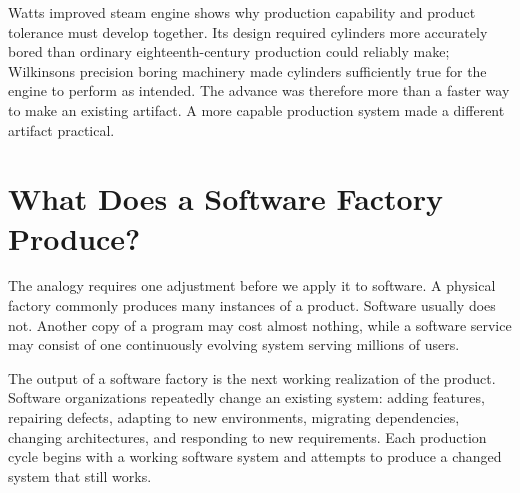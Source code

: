 
Watt\textquotesingle s improved steam engine shows why production capability and product tolerance must develop together. Its design required cylinders more accurately bored than ordinary eighteenth-century production could reliably make; Wilkinson\textquotesingle s precision boring machinery made cylinders sufficiently true for the engine to perform as intended. The advance was therefore more than a faster way to make an existing artifact. A more capable production system made a different artifact practical.

\section{What Does a Software Factory Produce?}\label{heading:what-does-a-software-factory-produce}


The analogy requires one adjustment before we apply it to software. A physical factory commonly produces many instances of a product. Software usually does not. Another copy of a program may cost almost nothing, while a software service may consist of one continuously evolving system serving millions of users.


The output of a software factory is the next working realization of the product. Software organizations repeatedly change an existing system: adding features, repairing defects, adapting to new environments, migrating dependencies, changing architectures, and responding to new requirements. Each production cycle begins with a working software system and attempts to produce a changed system that still works.

